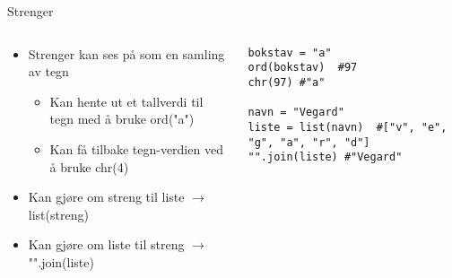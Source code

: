 \documentclass[screen, aspectratio=169]{beamer}
\begin{document}
\begin{frame}[fragile]{Strenger}
	\begin{columns}
		\begin{column}{.6\textwidth}
			\begin{itemize}
				\item Strenger kan ses på som en samling av tegn
				\begin{itemize}
					\item Kan hente ut et tallverdi til tegn med å bruke ord("a")
					\item Kan få tilbake tegn-verdien ved å bruke chr(4)
				\end{itemize}
				\item Kan gjøre om streng til liste $\rightarrow$ list(streng)
				\item Kan gjøre om liste til streng $\rightarrow$ "".join(liste)
			\end{itemize}
		\end{column}
		\begin{column}{.4\textwidth}
			\begin{lstlisting}
bokstav = "a"
ord(bokstav)  #97
chr(97) #"a"

navn = "Vegard"
liste = list(navn)  #["v", "e", "g", "a", "r", "d"]
"".join(liste) #"Vegard"
			\end{lstlisting}
		\end{column}
	\end{columns}
\end{frame}
\end{document}
